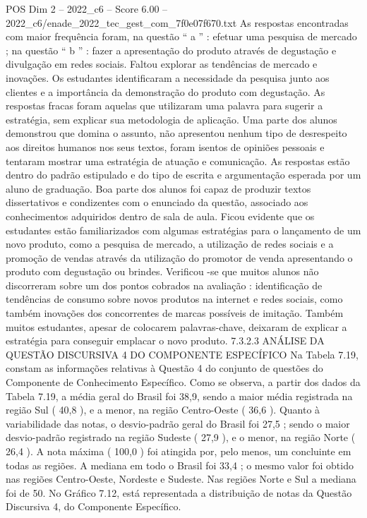 \begin{textsample}{POS Dim 2 – 2022\_c6 – Score 6.00 – 2022\_c6/enade\_2022\_tec\_gest\_com\_7f0e07f670.txt}
As respostas encontradas com maior frequência foram, na questão “ a ” : efetuar uma pesquisa de mercado ; na questão “ b ” : fazer a apresentação do produto através de degustação e divulgação em redes sociais.
Faltou explorar as tendências de mercado e inovações.
Os estudantes identificaram a necessidade da pesquisa junto aos clientes e a importância da demonstração do produto com degustação.
As respostas fracas foram aquelas que utilizaram uma palavra para sugerir a estratégia, sem explicar sua metodologia de aplicação.
Uma parte dos alunos demonstrou que domina o assunto, não apresentou nenhum tipo de desrespeito aos direitos humanos nos seus textos, foram isentos de opiniões pessoais e tentaram mostrar uma estratégia de atuação e comunicação.
As respostas estão dentro do padrão estipulado e do tipo de escrita e argumentação esperada por um aluno de graduação.
Boa parte dos alunos foi capaz de produzir textos dissertativos e condizentes com o enunciado da questão, associado aos conhecimentos adquiridos dentro de sala de aula.
Ficou evidente que os estudantes estão familiarizados com algumas estratégias para o lançamento de um novo produto, como a pesquisa de mercado, a utilização de redes sociais e a promoção de vendas através da utilização do promotor de venda apresentando o produto com degustação ou brindes.
Verificou -se que muitos alunos não discorreram sobre um dos pontos cobrados na avaliação : identificação de tendências de consumo sobre novos produtos na internet e redes sociais, como também inovações dos concorrentes de marcas possíveis de imitação.
Também muitos estudantes, apesar de colocarem palavras-chave, deixaram de explicar a estratégia para conseguir emplacar o novo produto. 7.3.2.3 ANÁLISE DA QUESTÃO DISCURSIVA 4 DO COMPONENTE ESPECÍFICO Na Tabela 7.19, constam as informações relativas à Questão 4 do conjunto de questões do Componente de Conhecimento Específico.
Como se observa, a partir dos dados da Tabela 7.19, a média geral do Brasil foi 38,9, sendo a maior média registrada na região Sul ( 40,8 ), e a menor, na região Centro-Oeste ( 36,6 ).
Quanto à variabilidade das notas, o desvio-padrão geral do Brasil foi 27,5 ; sendo o maior desvio-padrão registrado na região Sudeste ( 27,9 ), e o menor, na região Norte ( 26,4 ).
A nota máxima ( 100,0 ) foi atingida por, pelo menos, um concluinte em todas as regiões.
A mediana em todo o Brasil foi 33,4 ; o mesmo valor foi obtido nas regiões Centro-Oeste, Nordeste e Sudeste.
Nas regiões Norte e Sul a mediana foi de 50.
No Gráfico 7.12, está representada a distribuição de notas da Questão Discursiva 4, do Componente Específico.

\end{textsample}
